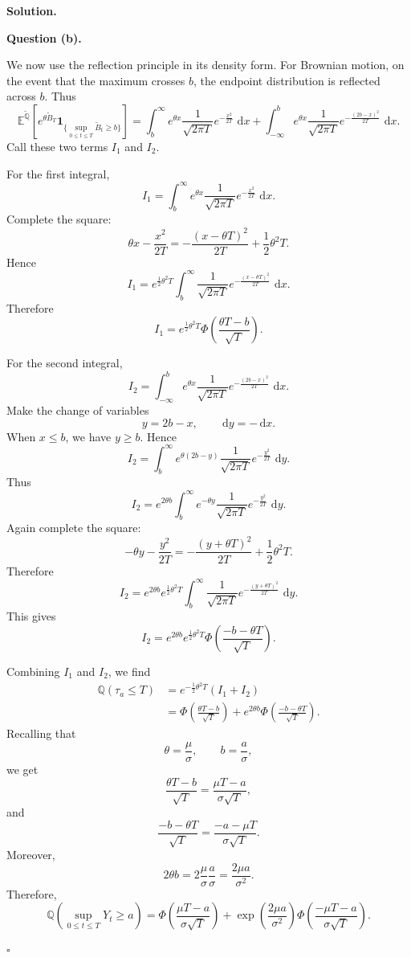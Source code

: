\documentclass[11pt]{article}
\theoremstyle{plain}
\newcommand{\dd}{\,\mathrm{d}}
\newcommand{\1}{\mathbf{1}}
\theoremstyle{definition}
\newenvironment{solution}
{\par\medskip\noindent\textbf{Solution.}\par\medskip}
{\hfill$\square$\par\medskip}
\newenvironment{solutionpart}[1]
{\par\medskip\noindent\textbf{#1.}\par\smallskip}
{\par\medskip}
\begin{document}
\begin{solution}
\begin{solutionpart}{Question (b)}
We now use the reflection principle in its density form. For Brownian motion,
on the event that the maximum crosses $b$, the endpoint distribution is reflected across $b$.
Thus
\[
\mathbb{E}^{\widetilde{\mathbb{Q}}}
\left[
e^{\theta\widetilde B_T}
\mathbf 1_{\{\sup_{0\le t\le T}\widetilde B_t\ge b\}}
\right]
=
\int_b^\infty e^{\theta x}\frac{1}{\sqrt{2\pi T}}e^{-\frac{x^2}{2T}}\,\dd x
+
\int_{-\infty}^b e^{\theta x}
\frac{1}{\sqrt{2\pi T}}
e^{-\frac{(2b-x)^2}{2T}}\,\dd x.
\]
Call these two terms $I_1$ and $I_2$.

For the first integral,
\[
I_1
=
\int_b^\infty e^{\theta x}\frac{1}{\sqrt{2\pi T}}e^{-\frac{x^2}{2T}}\,\dd x.
\]
Complete the square:
\[
\theta x-\frac{x^2}{2T}
=
-\frac{(x-\theta T)^2}{2T}
+
\frac12\theta^2T.
\]
Hence
\[
I_1
=
e^{\frac12\theta^2T}
\int_b^\infty
\frac{1}{\sqrt{2\pi T}}
e^{-\frac{(x-\theta T)^2}{2T}}\,\dd x.
\]
Therefore
\[
I_1
=
e^{\frac12\theta^2T}
\Phi\left(\frac{\theta T-b}{\sqrt T}\right).
\]

For the second integral,
\[
I_2
=
\int_{-\infty}^b e^{\theta x}
\frac{1}{\sqrt{2\pi T}}
e^{-\frac{(2b-x)^2}{2T}}\,\dd x.
\]
Make the change of variables
\[
y=2b-x,
\qquad
\dd y=-\dd x.
\]
When $x\le b$, we have $y\ge b$. Hence
\[
I_2
=
\int_b^\infty
e^{\theta(2b-y)}
\frac{1}{\sqrt{2\pi T}}
e^{-\frac{y^2}{2T}}\,\dd y.
\]
Thus
\[
I_2
=
e^{2\theta b}
\int_b^\infty
e^{-\theta y}
\frac{1}{\sqrt{2\pi T}}
e^{-\frac{y^2}{2T}}\,\dd y.
\]
Again complete the square:
\[
-\theta y-\frac{y^2}{2T}
=
-\frac{(y+\theta T)^2}{2T}
+
\frac12\theta^2T.
\]
Therefore
\[
I_2
=
e^{2\theta b}
e^{\frac12\theta^2T}
\int_b^\infty
\frac{1}{\sqrt{2\pi T}}
e^{-\frac{(y+\theta T)^2}{2T}}\,\dd y.
\]
This gives
\[
I_2
=
e^{2\theta b}
e^{\frac12\theta^2T}
\Phi\left(
\frac{-b-\theta T}{\sqrt T}
\right).
\]

Combining $I_1$ and $I_2$, we find
\[
\begin{aligned}
\mathbb{Q}(\tau_a\le T)
&=
e^{-\frac12\theta^2T}(I_1+I_2)\\
&=
\Phi\left(\frac{\theta T-b}{\sqrt T}\right)
+
e^{2\theta b}
\Phi\left(\frac{-b-\theta T}{\sqrt T}\right).
\end{aligned}
\]
Recalling that
\[
\theta=\frac{\mu}{\sigma},
\qquad
b=\frac{a}{\sigma},
\]
we get
\[
\frac{\theta T-b}{\sqrt T}
=
\frac{\mu T-a}{\sigma\sqrt T},
\]
and
\[
\frac{-b-\theta T}{\sqrt T}
=
\frac{-a-\mu T}{\sigma\sqrt T}.
\]
Moreover,
\[
2\theta b
=
2\frac{\mu}{\sigma}\frac{a}{\sigma}
=
\frac{2\mu a}{\sigma^2}.
\]
Therefore,
\[
\boxed{
\mathbb{Q}\left(\sup_{0\le t\le T}Y_t\ge a\right)
=
\Phi\left(\frac{\mu T-a}{\sigma\sqrt T}\right)
+
\exp\left(\frac{2\mu a}{\sigma^2}\right)
\Phi\left(\frac{-\mu T-a}{\sigma\sqrt T}\right).
}
\]
\end{solutionpart}


\end{solution}
\end{document}
